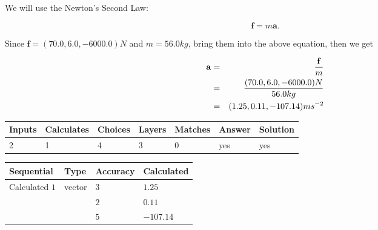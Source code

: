 \documentclass[12pt]{article}
\begin{document}
 
 
 
 
\noindent{}
 
 

We will use the Newton's Second Law:
 
\[
\mathbf{f}=m\mathbf{a}.
\]
 
Since $\mathbf{f}= %
(70.0 , 6.0 , -6000.0) N$
and $m= %
56.0kg$, bring them into the above equation, then we get
 
\begin{eqnarray*}
\mathbf{a}&=&\frac{\mathbf{f}}m  \\
&=&\frac{ %
(70.0 , 6.0 , -6000.0) N}{ %
56.0kg}  \\
&=& %
(1.25 , 0.11 , -107.14) ms^{-2}
\end{eqnarray*}
 
 
 
\noindent{}
 
 

 
 
\vspace{0.3in}
   
   
   
   
\noindent\begin{tabular}{|l|l|l|l|l|l|l|}
 \hline
Inputs & Calculates & Choices & Layers & Matches & Answer & Solution \\ \hline
           2  & 
           1  & 
           4
  & 
           3  & 
           0  & 
  yes & 
  yes 
  \\ \hline
 \end{tabular}
   
   
   
   
\noindent{}
   
   
  
  
\noindent\begin{tabular}{|l|l|l|l|}
\hline
 Sequential & Type & Accuracy & Calculated \\ 
\hline
 
 
  Calculated $            1 $ & vector &  
  $            3  $ 
 &  $ 1.25 $ 
 \\    
  & & 
  $            2  $ 
 &  $ 0.11 $ 
 \\    
  & & 
  $            5  $ 
 &  $ -107.14 $ 
 \\  \hline  
 \end{tabular}
   
\end{document}
